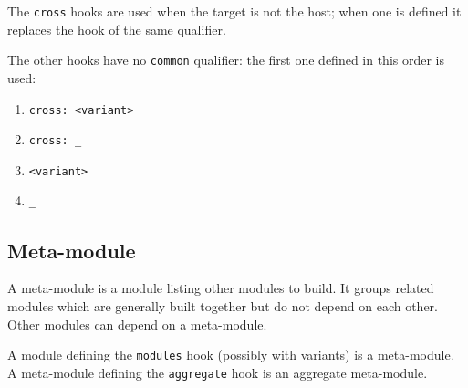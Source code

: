 \documentclass[a4paper,12pt,twoside]{article}
\newcommand{\code}[1]{\texttt{#1}}
\begin{document}
The \code{cross} hooks are used when the target is not the host; when one is defined it replaces the hook of the same qualifier.

The other hooks have no \code{common} qualifier: the first one defined in this order is used:

\begin{enumerate}
	\item \code{cross: <variant>}
	\item \code{cross: \_}
	\item \code{<variant>}
	\item \code{\_}
\end{enumerate}

\subsection{Meta-module}
\label{meta-module}

A meta-module is a module listing other modules to build. It groups related modules which are generally built together but do not depend on each other. Other modules can depend on a meta-module.

A module defining the \code{modules} hook (possibly with variants) is a meta-module. A meta-module defining the \code{aggregate} hook is an aggregate meta-module.
\end{document}
